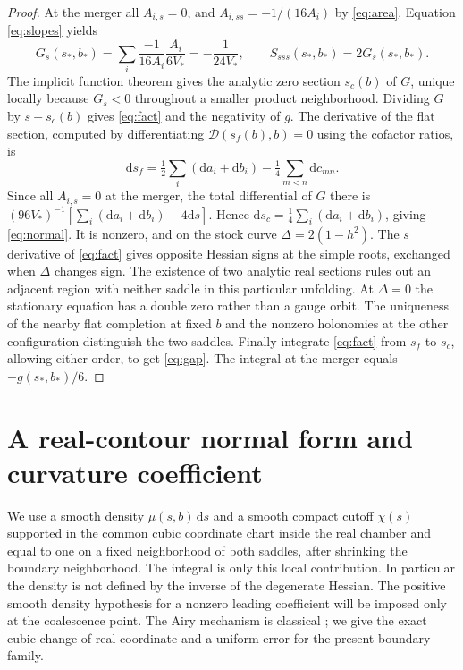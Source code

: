 \documentclass[11pt]{article}
\newcommand{\dd}{\mathrm d}
\newcommand{\calD}{\mathcal D}
\begin{document}
\begin{proof}
At the merger all \(A_{i,s}=0\), and \(A_{i,ss}=-1/(16 A_i)\) by \eqref{eq:area}. Equation \eqref{eq:slopes} yields
\[
 G_s(s_*,b_*)=\sum_i\frac{-1}{16A_i}\frac{A_i}{6V_*}
        =-\frac1{24V_*},\qquad S_{sss}(s_*,b_*)=2G_s(s_*,b_*).
\]
The implicit function theorem gives the analytic zero section \(s_c(b)\) of \(G\), unique locally because \(G_s<0\) throughout a smaller product neighborhood. Dividing \(G\) by \(s-s_c(b)\) gives \eqref{eq:fact} and the negativity of \(g\). The derivative of the flat section, computed by differentiating \(\calD(s_f(b),b)=0\) using the cofactor ratios, is
\[
 \dd s_f=\tfrac12\sum_i(\dd a_i+\dd b_i)-\tfrac14\sum_{m<n}\dd c_{mn}.
\]
Since all \(A_{i,s}=0\) at the merger, the total differential of \(G\) there is
\((96V_*)^{-1}[\sum_i(\dd a_i+\dd b_i)-4\dd s]\). Hence \(\dd s_c=\frac14\sum_i(\dd a_i+\dd b_i)\), giving \eqref{eq:normal}. It is nonzero, and on the stock curve \(\Delta=2(1-h^2)\). The \(s\) derivative of \eqref{eq:fact} gives opposite Hessian signs at the simple roots, exchanged when \(\Delta\) changes sign. The existence of two analytic real sections rules out an adjacent region with neither saddle in this particular unfolding. At \(\Delta=0\) the stationary equation has a double zero rather than a gauge orbit. The uniqueness of the nearby flat completion at fixed \(b\) and the nonzero holonomies at the other configuration distinguish the two saddles. Finally integrate \eqref{eq:fact} from \(s_f\) to \(s_c\), allowing either order, to get \eqref{eq:gap}. The integral at the merger equals \(-g(s_*,b_*)/6\).
\end{proof}

\section{A real-contour normal form and curvature coefficient}

We use a smooth density \(\mu(s,b)\,\dd s\) and a smooth compact cutoff \(\chi(s)\) supported in the common cubic coordinate chart inside the real chamber and equal to one on a fixed neighborhood of both saddles, after shrinking the boundary neighborhood. The integral is only this local contribution. In particular the density is not defined by the inverse of the degenerate Hessian. The positive smooth density hypothesis for a nonzero leading coefficient will be imposed only at the coalescence point. The Airy mechanism is classical \cite{CFU}; we give the exact cubic change of real coordinate and a uniform error for the present boundary family.
\end{document}
